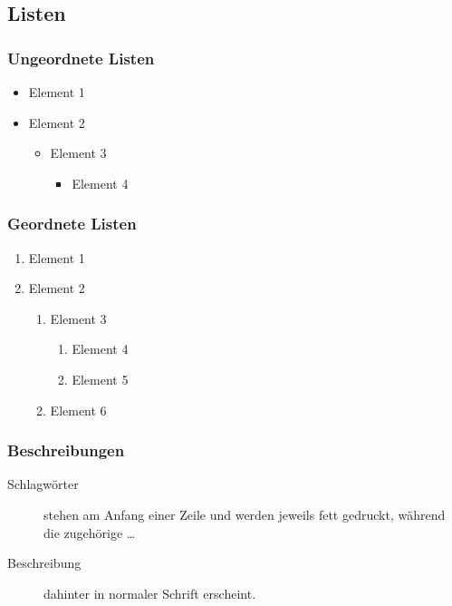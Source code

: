 \subsection{Listen}
\label{sec:Listen}

\subsubsection{Ungeordnete Listen}
\label{sec:UngeordneteListen}

\begin{itemize}
	\item Element 1
	\item Element 2
	\begin{itemize}
		\item Element 3
		\begin{itemize}
			\item Element 4
		\end{itemize}
	\end{itemize}
\end{itemize}

\subsubsection{Geordnete Listen}
\label{sec:GeordneteListen}

\begin{enumerate}
	\item Element 1
	\item Element 2
	\begin{enumerate}
		\item Element 3
		\begin{enumerate}
			\item Element 4
			\item Element 5
		\end{enumerate}
		\item Element 6
	\end{enumerate}
\end{enumerate}

\subsubsection{Beschreibungen}
\label{sec:Beschreibungen}

\begin{description}
	\item[Schlagwörter] stehen am Anfang einer Zeile und werden jeweils fett gedruckt, während die zugehörige \dots
	\item[Beschreibung] dahinter in normaler Schrift erscheint.
\end{description}


